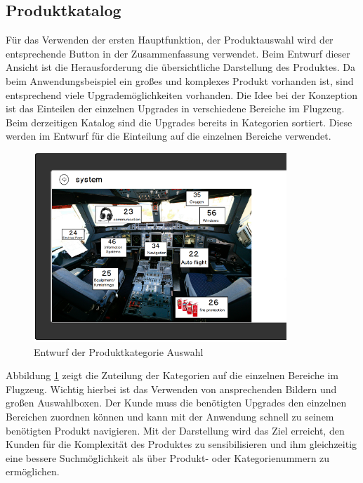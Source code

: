 \subsection{Produktkatalog}
Für das Verwenden der ersten Hauptfunktion, der Produktauswahl wird der entsprechende Button in der Zusammenfassung verwendet. Beim Entwurf dieser Ansicht ist die Herausforderung die übersichtliche Darstellung des Produktes. Da beim Anwendungsbeispiel ein großes und komplexes Produkt vorhanden ist, sind entsprechend viele Upgrademöglichkeiten vorhanden. Die Idee bei der Konzeption ist das Einteilen der einzelnen Upgrades in verschiedene Bereiche im Flugzeug. Beim derzeitigen Katalog sind die Upgrades bereits in Kategorien sortiert. Diese werden im Entwurf für die Einteilung auf die einzelnen Bereiche verwendet. \par

\begin{figure}[H]
\centering
\includegraphics[width=360px]{images/catalogue_entwurf}
\caption{Entwurf der Produktkategorie Auswahl}
\label{catalogueSketch}
\end{figure}
Abbildung \ref{catalogueSketch} zeigt die Zuteilung der Kategorien auf die einzelnen Bereiche im Flugzeug. Wichtig hierbei ist das Verwenden von ansprechenden Bildern und großen Auswahlboxen. Der Kunde muss die benötigten Upgrades den einzelnen Bereichen zuordnen können und kann mit der Anwendung schnell zu seinem benötigten Produkt navigieren. Mit der Darstellung wird das Ziel erreicht, den Kunden für die Komplexität des Produktes zu sensibilisieren und ihm gleichzeitig eine bessere Suchmöglichkeit als über Produkt- oder Kategorienummern zu ermöglichen. \par 

